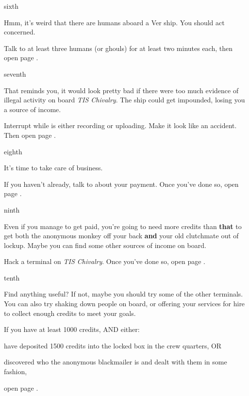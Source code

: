 \documentclass[greennotebook]{guildcamp4} %
\begin{document}
\begin{page}{sixth}

Hmm, it's weird that there are humans aboard a Ver ship. You should act concerned.

Talk to at least three humans (or ghouls) for at least two minutes each, then open page .

\end{page}

\begin{page}{seventh}

That reminds you, it would look pretty bad if there were too much evidence of illegal activity on board \emph{TIS Chivalry}. The ship could get impounded, losing you a source of income.

Interrupt \cCgood{} while  is either recording or uploading. Make it look like an accident. Then open page .

\end{page}

\begin{page}{eighth}

It's time to take care of business.

If you haven't already, talk to \cVone{} about your payment. Once you've done so, open page .

\end{page}

\begin{page}{ninth}

Even if you manage to get paid, you're going to need more credits than {\bf that} to get both the anonymous monkey off your back {\bf and} your old clutchmate out of lockup. Maybe you can find some other sources of income on board.

Hack a terminal on \emph{TIS Chivalry}. Once you've done so, open page .

\end{page}

\begin{page}{tenth}

Find anything useful? If not, maybe you should try some of the other terminals. You can also try shaking down people on board, or offering your services for hire to collect enough credits to meet your goals.

If you have at least 1000 credits, AND either:

\begin{itemz}
\item have deposited 1500 credits into the locked box in the crew quarters, OR 
\item discovered who the anonymous blackmailer is and dealt with them in some fashion,
\end{itemz}

open page .

\end{page}
\end{document}

